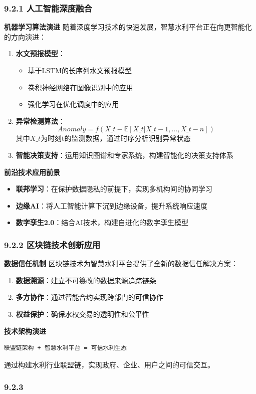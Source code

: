 {\subsubsection{9.2.1 人工智能深度融合}\label{ux4ebaux5de5ux667aux80fdux6df1ux5ea6ux878dux5408} \textbf{机器学习算法演进}
随着深度学习技术的快速发展，智慧水利平台正在向更智能化的方向演进： \begin{enumerate} \def\labelenumi{\arabic{enumi}.} \item \textbf{水文预报模型}：
\begin{itemize} \tightlist \item 基于LSTM的长序列水文预报模型 \item 卷积神经网络在图像识别中的应用 \item 强化学习在优化调度中的应用 \end{itemize} \item
\textbf{异常检测算法}： \[Anomaly = f(X\_t - \mathbb{E}[X\_t|X\_{t-1}, ..., X\_{t-n}])\] 其中\(X\_t\)为时刻t的监测数据，通过时序分析识别异常状态 \item
\textbf{智能决策支持}：运用知识图谱和专家系统，构建智能化的决策支持体系 \end{enumerate} \textbf{前沿技术应用前景} \begin{itemize} \tightlist \item
\textbf{联邦学习}：在保护数据隐私的前提下，实现多机构间的协同学习 \item \textbf{边缘AI}：将人工智能计算下沉到边缘设备，提升系统响应速度 \item
\textbf{数字孪生2.0}：结合AI技术，构建自进化的数字孪生模型 \end{itemize} \subsubsection{9.2.2
区块链技术创新应用}\label{ux533aux5757ux94feux6280ux672fux521bux65b0ux5e94ux7528} \textbf{数据信任机制} 区块链技术为智慧水利平台提供了全新的数据信任解决方案：
\begin{enumerate} \def\labelenumi{\arabic{enumi}.} \tightlist \item \textbf{数据溯源}：建立不可篡改的数据来源追踪链条 \item
\textbf{多方协作}：通过智能合约实现跨部门的可信协作 \item \textbf{权益保护}：确保水权交易的透明性和公平性 \end{enumerate} \textbf{技术架构演进} \begin{lstlisting}
联盟链架构 + 智慧水利平台 = 可信水利生态 \end{lstlisting} 通过构建水利行业联盟链，实现政府、企业、用户之间的可信交互。 \subsubsection{9.2.3
}}
